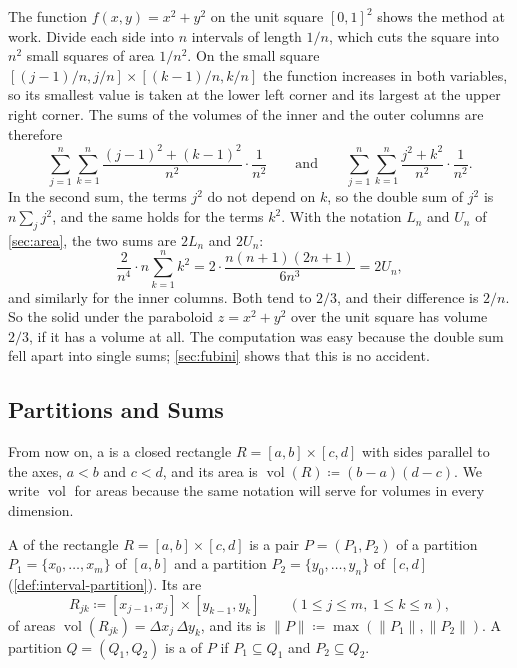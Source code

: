 The function $f(x,y)=x^2+y^2$ on the unit square $[0,1]^2$ shows the method at work. Divide each side into $n$ intervals of length $1/n$, which cuts the square into $n^2$ small squares of area $1/n^2$. On the small square $[(j-1)/n,j/n]\times[(k-1)/n,k/n]$ the function increases in both variables, so its smallest value is taken at the lower left corner and its largest at the upper right corner. The sums of the volumes of the inner and the outer columns are therefore
\[
\sum_{j=1}^n\sum_{k=1}^n\frac{(j-1)^2+(k-1)^2}{n^2}\cdot\frac1{n^2}\qquad\text{and}\qquad\sum_{j=1}^n\sum_{k=1}^n\frac{j^2+k^2}{n^2}\cdot\frac1{n^2}.
\]
In the second sum, the terms $j^2$ do not depend on $k$, so the double sum of $j^2$ is $n\sum_jj^2$, and the same holds for the terms $k^2$. With the notation $L_n$ and $U_n$ of \cref{sec:area}, the two sums are $2L_n$ and $2U_n$:
\[
\frac2{n^4}\cdot n\sum_{k=1}^{n}k^2=2\cdot\frac{n(n+1)(2n+1)}{6n^3}=2U_n ,
\]
and similarly for the inner columns. Both tend to $2/3$, and their difference is $2/n$. So the solid under the paraboloid $z=x^2+y^2$ over the unit square has volume $2/3$, if it has a volume at all. The computation was easy because the double sum fell apart into single sums; \cref{sec:fubini} shows that this is no accident.

\subsection{Partitions and Sums}

From now on, a  is a closed rectangle $R=[a,b]\times[c,d]$ with sides parallel to the axes, $a<b$ and $c<d$, and its area is $\operatorname{vol}(R)\coloneqq(b-a)(d-c)$. We write $\operatorname{vol}$ for areas because the same notation will serve for volumes in every dimension.

\begin{definition}
\label{def:rectangle-partition}
A  of the rectangle $R=[a,b]\times[c,d]$ is a pair $P=(P_1,P_2)$ of a partition $P_1=\{x_0,\ldots,x_m\}$ of $[a,b]$ and a partition $P_2=\{y_0,\ldots,y_n\}$ of $[c,d]$ (\cref{def:interval-partition}). Its  are
\[
R_{jk}\coloneqq[x_{j-1},x_j]\times[y_{k-1},y_k]\qquad(1\le j\le m,\ 1\le k\le n),
\]
of areas $\operatorname{vol}(R_{jk})=\Delta x_j\,\Delta y_k$, and its  is $\|P\|\coloneqq\max(\|P_1\|,\|P_2\|)$. A partition $Q=(Q_1,Q_2)$ is a  of $P$ if $P_1\subseteq Q_1$ and $P_2\subseteq Q_2$.
\end{definition}

